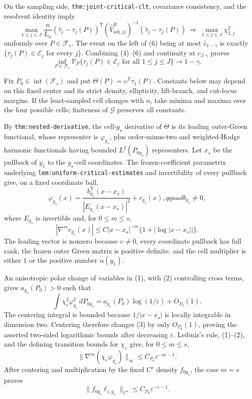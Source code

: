 On the sampling side, \texttt{thm:joint-critical-clt}, covariance consistency, and the resolvent identity imply
\[
 \max_{1\leq j\leq J}\frac n{L_n}
 (\widehat\tau_j-\tau_j(P))^{\mathsf T}
 (\widehat V_{\mathrm{adj},jj}^R)^{-1}
 (\widehat\tau_j-\tau_j(P))
 \ \Longrightarrow\ \max_{1\leq j\leq J}\chi^2_{2,j}             \tag{6}
\]
uniformly over \(P\in\mathcal F_s\).  The event on the left of (6) being at most \(\widehat c_{1-\gamma}\) is exactly
\(\{\tau_j(P)\in\mathcal E_j\text{ for every }j\}\).  Combining (4)--(6) and continuity at \(c_{J,\gamma}\) proves
\[
 \inf_{P\in\mathcal F_s}\mathbb P_P
 \{\tau_j(P)\in\mathcal E_j\text{ for all }1\leq j\leq J\}
 \longrightarrow1-\gamma.                                            \tag{7}
\]

Fix \(P_0\in\operatorname{int}(\mathcal F_s)\) and put
\(\Theta(P)=\upsilon^{\mathsf T}\tau_1(P)\).  Constants below may depend on this fixed center and its strict density, ellipticity, lift-branch, and cut-locus margins.  If the least-sampled cell changes with \(n\), take minima and maxima over the four possible cells; finiteness of \(\mathcal G\) preserves all constants.

By \texttt{thm:nested-derivative}, the cell-\(g_\star\) derivative of \(\Theta\) is its leading outer-Green functional, whose representer is \(\varphi_{g_\star}\), plus order-minus-two and weighted-Hodge harmonic functionals having bounded \(L^2(P_{0g_\star})\) representers.  Let \(x_\star\) be the pullback of \(y_1\) to the \(g_\star\)-cell coordinates.  The frozen-coefficient parametrix underlying \texttt{lem:uniform-critical-estimates} and invertibility of every pullback give, on a fixed coordinate ball,
\[
 \varphi_{g_\star}(x)=
 \frac{b_{g_\star}^{\mathsf T}(x-x_\star)}
 {|E_{g_\star}(x-x_\star)|^2}+r_{g_\star}(x),qquad b_{g_\star}\neq0, \tag{1}
\]
where \(E_{g_\star}\) is invertible and, for \(0\leq m\leq s\),
\[
 |\nabla^m r_{g_\star}(x)|
 \leq C|x-x_\star|^{-m}\{1+|\log|x-x_\star||\}.                     \tag{2}
\]
The leading vector is nonzero because \(\upsilon\neq0\), every coordinate pullback has full rank, the frozen outer Green matrix is positive definite, and the cell multiplier is either \(1\) or the positive number \(\alpha(y_1)\).

An anisotropic polar change of variables in (1), with (2) controlling cross terms, gives \(a_{g_\star}(P_0)>0\) such that
\[
 \int\chi_\varepsilon^2\varphi_{g_\star}^2\,dP_{0g_\star}
 =a_{g_\star}(P_0)\log(1/\varepsilon)+O_{P_0}(1).                     \tag{3}
\]
The centering integral is bounded because \(1/|x-x_\star|\) is locally integrable in dimension two.  Centering therefore changes (3) by only \(O_{P_0}(1)\), proving the asserted two-sided logarithmic bounds after decreasing \(\varepsilon\).  Leibniz's rule, (1)--(2), and the defining transition bounds for \(\chi_\varepsilon\) give, for \(0\leq m\leq s\),
\[
 \|\nabla^m(\chi_\varepsilon\varphi_{g_\star})\|_\infty
 \leq C_{P_0}\varepsilon^{-m-1}.                                     \tag{4}
\]
After centering and multiplication by the fixed \(C^s\) density \(f_{0g_\star}\), the case \(m=s\) proves
\[
 \|f_{0g_\star}\ell_{\varepsilon,g_\star}\|_{C^s}
 \leq C_{P_0}\varepsilon^{-s-1}.                                     \tag{5}
\]

